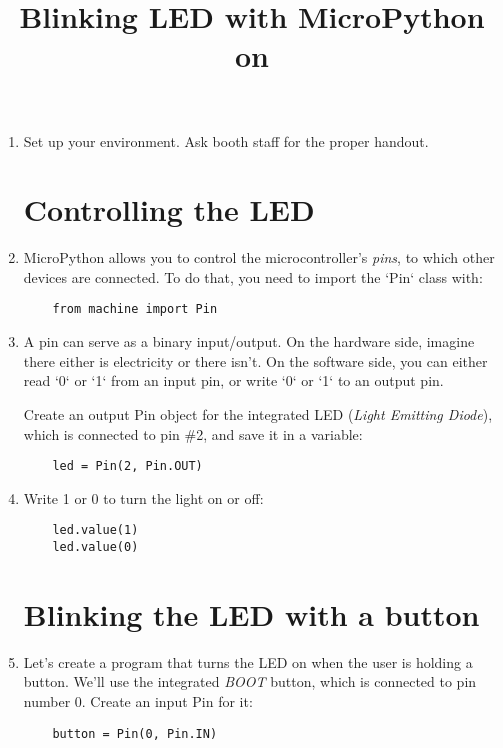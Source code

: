 \documentclass{../tutorial}
\title{Blinking LED with MicroPython on \abbr{ESP32}}
\begin{document}
\begin{enumerate}

\item
    Set up your environment. Ask booth staff for the proper handout.

\section{Controlling the LED}

\item
    MicroPython allows you to control the microcontroller's \emph{pins},
    to which other devices are connected.
    To do that, you need to import the `Pin` class with:

    \begin{lstlisting}
    from machine import Pin
    \end{lstlisting}

\item
    A pin can serve as a binary input/output.
    On the hardware side, imagine there either is electricity or there isn't.
    On the software side, you can either read `0` or `1` from an
    input pin, or write `0` or `1` to an output pin.

    Create an output Pin object for the integrated LED (\emph{Light Emitting Diode}),
    which is connected to pin \#2, and save it in a variable:

    \begin{lstlisting}
    led = Pin(2, Pin.OUT)
    \end{lstlisting}

\item
    Write 1 or 0 to turn the light on or off:

    \begin{lstlisting}
    led.value(1)
    led.value(0)
    \end{lstlisting}

\section{Blinking the LED with a button}

\item
    Let's create a program that turns the LED on when the user is holding a button.
    We'll use the integrated \emph{BOOT} button, which is connected to pin number 0.
    Create an input Pin for it:

    \begin{lstlisting}
    button = Pin(0, Pin.IN)
    \end{lstlisting}


\end{enumerate}
\end{document}
